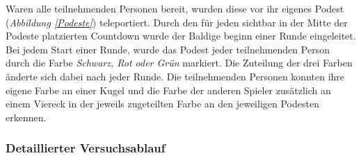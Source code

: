 \documentclass[a4paper,11pt]{article}%
\renewcommand{\\}{\vspace*{0.5\baselineskip} \newline}
\begin{document}
%

Waren alle teilnehmenden Personen bereit, wurden diese vor ihr eigenes Podest (\textit{Abbildung \ref{Podeste}}) teleportiert. Durch den für jeden sichtbar in der Mitte der Podeste platzierten Countdown wurde der Baldige beginn einer Runde eingeleitet.
Bei jedem Start einer Runde, wurde das Podest jeder teilnehmenden Person durch die Farbe \textit{Schwarz, Rot oder Grün} markiert. Die Zuteilung der drei Farben änderte sich dabei nach jeder Runde. Die teilnehmenden Personen konnten ihre eigene Farbe an einer Kugel und die Farbe der anderen Spieler zusätzlich an einem Viereck in der jeweils zugeteilten Farbe an den jeweiligen Podesten erkennen. 

	\subsubsection{Detaillierter Versuchsablauf}
\end{document}
